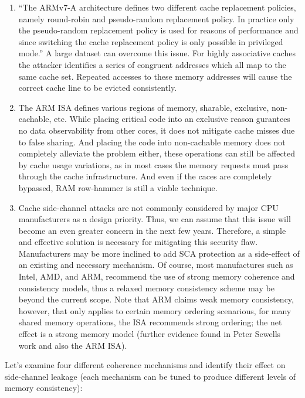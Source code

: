 \begin{enumerate}
	\item ``The ARMv7-A architecture defines two different cache replacement policies, namely round-robin and pseudo-random replacement policy. In practice only the pseudo-random replacement policy is used for reasons of performance and since switching the cache replacement policy is only possible in privileged mode.'' A large dataset can overcome this issue. For highly associative caches the attacker identifies a series of congruent addresses which all map to the same cache set. Repeated accesses to these memory addresses will cause the correct cache line to be evicted consistently.
	\item The ARM ISA defines various regions of memory, sharable, exclusive, non-cachable, etc. While placing critical code into an exclusive reason gurantees no data observability from other cores, it does not mitigate cache misses due to false sharing. And placing the code into non-cachable memory does not completely alleviate the problem either, these operations can still be affected by cache usage variations, as in most cases the memory requests must pass through the cache infrastructure. And even if the caces are completely bypassed, RAM row-hammer is still a viable technique.
	\item Cache side-channel attacks are not commonly considered by major CPU manufacturers as a design priority. Thus, we can assume that this issue will become an even greater concern in the next few years. Therefore, a simple and effective solution is necessary for mitigating this security flaw. Manufacturers may be more inclined to add SCA protection as a side-effect of an existing and necessary mechanism. Of course, most manufactures such as Intel, AMD, and ARM, recommend the use of strong memory coherence and consistency models, thus a relaxed memory consistency scheme may be beyond the current scope. Note that ARM claims weak memory consistency, however, that only applies to certain memory ordering scenarious, for many shared memory operations, the ISA recommends strong ordering; the net effect is a strong memory model (further evidence found in Peter Sewells work and also the ARM ISA).
	\end{enumerate}
	
	Let's examine four different coherence mechanisms and identify their effect on side-channel leakage (each mechanism can be tuned to produce different levels of memory consistency):
	
